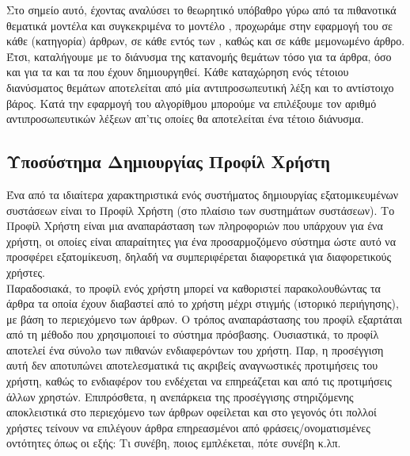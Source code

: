 {{{{{{{{\nocite{RecommendLda, Lda03, Scenepaper, Exp01, Hybrid, Adapt, Mining}

Στο σημείο αυτό, έχοντας αναλύσει το θεωρητικό υπόβαθρο γύρω από τα πιθανοτικά θεματικά μοντέλα και συγκεκριμένα το μοντέλο {}, 
προχωράμε στην εφαρμογή του {} σε κάθε {} (κατηγορία) άρθρων, σε κάθε {} εντός των {}, 
καθώς και σε κάθε μεμονωμένο άρθρο.
Έτσι, καταλήγουμε με το διάνυσμα της κατανομής θεμάτων τόσο για τα άρθρα, όσο και για τα {} και τα {} που έχουν δημιουργηθεί. 
Κάθε καταχώρηση ενός τέτοιου διανύσματος θεμάτων αποτελείται από μία αντιπροσωπευτική λέξη και το αντίστοιχο βάρος. 
Κατά την εφαρμογή του αλγορίθμου μπορούμε να επιλέξουμε τον αριθμό αντιπροσωπευτικών λέξεων απ'τις οποίες θα αποτελείται ένα τέτοιο διάνυσμα. 

\subsection{Υποσύστημα Δημιουργίας Προφίλ Χρήστη}

Ένα από τα ιδιαίτερα χαρακτηριστικά ενός συστήματος δημιουργίας εξατομικευμένων
συστάσεων είναι το Προφίλ Χρήστη (στο πλαίσιο των συστημάτων συστάσεων). Το
Προφίλ Χρήστη είναι μια αναπαράσταση των πληροφοριών που υπάρχουν για ένα
χρήστη, οι οποίες είναι απαραίτητες για ένα προσαρμοζόμενο σύστημα ώστε αυτό να
προσφέρει εξατομίκευση, δηλαδή να συμπεριφέρεται διαφορετικά για διαφορετικούς
χρήστες. \\

Παραδοσιακά, το προφίλ ενός χρήστη μπορεί να καθοριστεί παρακολουθώντας τα άρθρα 
τα οποία έχουν διαβαστεί από το χρήστη μέχρι στιγμής (ιστορικό περιήγησης), με βάση το περιεχόμενο των άρθρων. 
Ο τρόπος αναπαράστασης του προφίλ εξαρτάται από τη μέθοδο που χρησιμοποιεί το σύστημα πρόσβασης.
Ουσιαστικά, το προφίλ αποτελεί ένα σύνολο των πιθανών ενδιαφερόντων του χρήστη.
Παρ, η προσέγγιση αυτή δεν αποτυπώνει αποτελεσματικά τις ακριβείς αναγνωστικές προτιμήσεις του χρήστη, 
καθώς το ενδιαφέρον του ενδέχεται να επηρεάζεται και από τις προτιμήσεις άλλων χρηστών. 
Επιπρόσθετα, η ανεπάρκεια της προσέγγισης στηριζόμενης αποκλειστικά στο περιεχόμενο των άρθρων 
οφείλεται και στο γεγονός ότι πολλοί χρήστες τείνουν να επιλέγουν άρθρα επηρεασμένοι 
από φράσεις/ονοματισμένες οντότητες όπως οι εξής: Τι συνέβη, ποιος εμπλέκεται, πότε συνέβη κ.λπ. \\

}}}}}}}}
